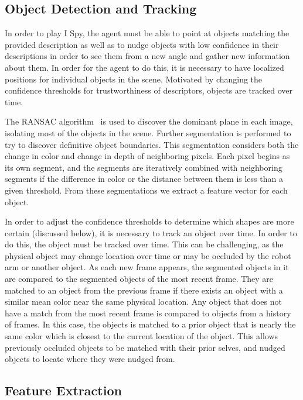 \documentclass[11pt]{article}
\begin{document}
\subsection{Object Detection and Tracking}
In order to play I Spy, the agent must be able to point at objects matching the
provided description as well as to nudge objects with low confidence in their
descriptions in order to see them from a new angle and gather new information
about them. In order for the agent to do this, it is necessary to have localized
positions for individual objects in the scene. Motivated by changing the confidence
thresholds for trustworthiness of descriptors, objects are tracked over time.

The RANSAC algorithm~\cite{fischler1981random} is used to discover the dominant
plane in each image, isolating most of the objects in the scene. Further
segmentation is performed to try to discover definitive object boundaries. This
segmentation considers both the change in color and change in depth of neighboring
pixels. Each pixel begins as its own segment, and the segments are iteratively
combined with neighboring segments if the difference in color or the distance
between them is less than a given threshold. From these segmentations we extract
a feature vector for each object.

In order to adjust the confidence thresholds to determine which shapes are more
certain (discussed below), it is necessary to track an object over time. In order
to do this, the object must be tracked over time. This can be challenging, as the
physical object may change location over time or may be occluded by the robot arm
or another object. As each new frame appears, the segmented objects in it are
compared to the segmented objects of the most recent frame. They are matched to
an object from the previous frame if there exists an object with a similar mean
color near the same physical location. Any object that does not have a match from
the most recent frame is compared to objects from a history of frames. In this case,
the objects is matched to a prior object that is nearly the same color which
is closest to the current location of the object. This allows previously occluded
objects to be matched with their prior selves, and nudged objects to locate where
they were nudged from.

\subsection{Feature Extraction}
\end{document}
